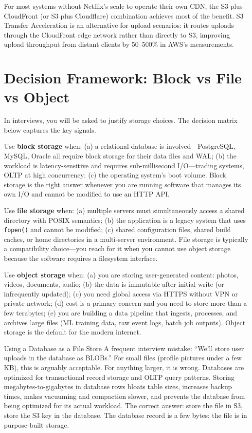 \documentclass[11pt,a4paper]{article}
\begin{document}
For most systems without Netflix's scale to operate their own CDN, the S3 plus CloudFront (or S3 plus Cloudflare) combination achieves most of the benefit. S3 Transfer Acceleration is an alternative for upload scenarios: it routes uploads through the CloudFront edge network rather than directly to S3, improving upload throughput from distant clients by 50--500\% in AWS's measurements.

\section{Decision Framework: Block vs File vs Object}

In interviews, you will be asked to justify storage choices. The decision matrix below captures the key signals.

Use \textbf{block storage} when: (a) a relational database is involved---PostgreSQL, MySQL, Oracle all require block storage for their data files and WAL; (b) the workload is latency-sensitive and requires sub-millisecond I/O---trading systems, OLTP at high concurrency; (c) the operating system's boot volume. Block storage is the right answer whenever you are running software that manages its own I/O and cannot be modified to use an HTTP API.

Use \textbf{file storage} when: (a) multiple servers must simultaneously access a shared directory with POSIX semantics; (b) the application is a legacy system that uses \texttt{fopen()} and cannot be modified; (c) shared configuration files, shared build caches, or home directories in a multi-server environment. File storage is typically a compatibility choice---you reach for it when you cannot use object storage because the software requires a filesystem interface.

Use \textbf{object storage} when: (a) you are storing user-generated content: photos, videos, documents, audio; (b) the data is immutable after initial write (or infrequently updated); (c) you need global access via HTTPS without VPN or private network; (d) cost is a primary concern and you need to store more than a few terabytes; (e) you are building a data pipeline that ingests, processes, and archives large files (ML training data, raw event logs, batch job outputs). Object storage is the default for the modern internet.

\begin{trapbox}{Using a Database as a File Store}
A frequent interview mistake: ``We'll store user uploads in the database as BLOBs.'' For small files (profile pictures under a few KB), this is arguably acceptable. For anything larger, it is wrong. Databases are optimized for transactional record storage and OLTP query patterns. Storing megabytes-to-gigabytes in database rows bloats table sizes, increases backup times, makes vacuuming and compaction slower, and prevents the database from being optimized for its actual workload. The correct answer: store the file in S3, store the S3 key in the database. The database record is a few bytes; the file is in purpose-built storage.
\end{trapbox}
\end{document}
